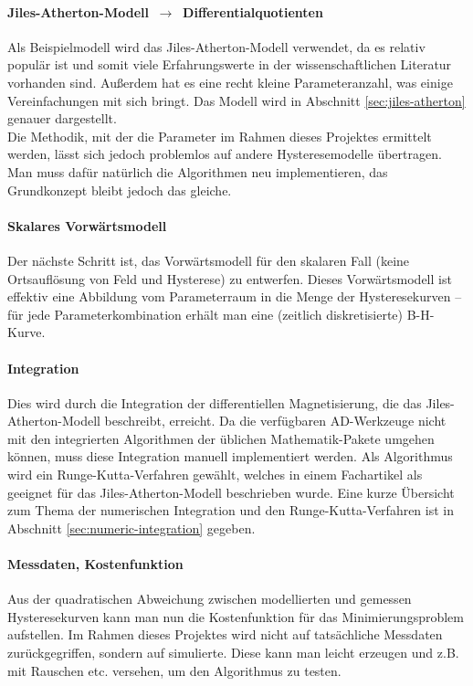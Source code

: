 \documentclass{scrartcl}
\begin{document}
\paragraph{Jiles-Atherton-Modell $\,\rightarrow\,$ Differentialquotienten}
Als Beispielmodell wird das Jiles-Atherton-Modell verwendet, da es relativ populär ist und somit viele Erfahrungswerte in der wissenschaftlichen Literatur vorhanden sind. Außerdem hat es eine recht kleine Parameteranzahl, was einige Vereinfachungen mit sich bringt. Das Modell wird in Abschnitt \ref{sec:jiles-atherton} genauer dargestellt.\\
Die Methodik, mit der die Parameter im Rahmen dieses Projektes ermittelt werden, lässt sich jedoch problemlos auf andere Hysteresemodelle übertragen. Man muss dafür natürlich die Algorithmen neu implementieren, das Grundkonzept bleibt jedoch das gleiche.
\paragraph{Skalares Vorwärtsmodell} Der nächste Schritt ist, das Vorwärtsmodell für den skalaren Fall (keine Ortsauflösung von Feld und Hysterese) zu entwerfen. Dieses Vorwärtsmodell ist effektiv eine Abbildung vom Parameterraum in die Menge der Hysteresekurven -- für jede Parameterkombination erhält man eine (zeitlich diskretisierte) B-H-Kurve.
\paragraph{Integration} Dies wird durch die Integration der differentiellen Magnetisierung, die das Jiles-Atherton-Modell beschreibt, erreicht. Da die verfügbaren AD-Werkzeuge nicht mit den integrierten Algorithmen der üblichen Mathematik-Pakete umgehen können, muss diese Integration manuell implementiert werden. Als Algorithmus wird ein Runge-Kutta-Verfahren gewählt, welches in einem Fachartikel \cite{ja-rk} als geeignet für das Jiles-Atherton-Modell beschrieben wurde. Eine kurze Übersicht zum Thema der numerischen Integration und den Runge-Kutta-Verfahren ist in Abschnitt \ref{sec:numeric-integration} gegeben.
\paragraph{Messdaten, Kostenfunktion} Aus der quadratischen Abweichung zwischen modellierten und gemessen Hysteresekurven kann man nun die Kostenfunktion für das Minimierungsproblem aufstellen. Im Rahmen dieses Projektes wird nicht auf tatsächliche Messdaten zurückgegriffen, sondern auf simulierte. Diese kann man leicht erzeugen und z.B. mit Rauschen etc. versehen, um den Algorithmus zu testen.
\end{document}
